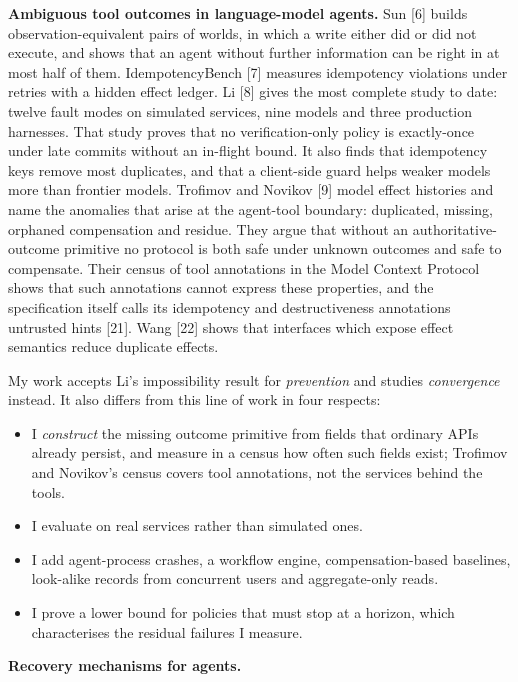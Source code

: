 \documentclass[
  10pt,
]{article}
\providecommand{\tightlist}{%
  \setlength{\itemsep}{0pt}\setlength{\parskip}{0pt}}
\begin{document}
\textbf{Ambiguous tool outcomes in language-model agents.} Sun {[}6{]}
builds observation-equivalent pairs of worlds, in which a write either
did or did not execute, and shows that an agent without further
information can be right in at most half of them. IdempotencyBench
{[}7{]} measures idempotency violations under retries with a hidden
effect ledger. Li {[}8{]} gives the most complete study to date: twelve
fault modes on simulated services, nine models and three production
harnesses. That study proves that no verification-only policy is
exactly-once under late commits without an in-flight bound. It also
finds that idempotency keys remove most duplicates, and that a
client-side guard helps weaker models more than frontier models.
Trofimov and Novikov {[}9{]} model effect histories and name the
anomalies that arise at the agent-tool boundary: duplicated, missing,
orphaned compensation and residue. They argue that without an
authoritative-outcome primitive no protocol is both safe under unknown
outcomes and safe to compensate. Their census of tool annotations in the
Model Context Protocol shows that such annotations cannot express these
properties, and the specification itself calls its idempotency and
destructiveness annotations untrusted hints {[}21{]}. Wang {[}22{]}
shows that interfaces which expose effect semantics reduce duplicate
effects.

My work accepts Li's impossibility result for \emph{prevention} and
studies \emph{convergence} instead. It also differs from this line of
work in four respects:

\begin{itemize}
\tightlist
\item
  I \emph{construct} the missing outcome primitive from fields that
  ordinary APIs already persist, and measure in a census how often such
  fields exist; Trofimov and Novikov's census covers tool annotations,
  not the services behind the tools.
\item
  I evaluate on real services rather than simulated ones.
\item
  I add agent-process crashes, a workflow engine, compensation-based
  baselines, look-alike records from concurrent users and aggregate-only
  reads.
\item
  I prove a lower bound for policies that must stop at a horizon, which
  characterises the residual failures I measure.
\end{itemize}

\textbf{Recovery mechanisms for agents.}
\end{document}
